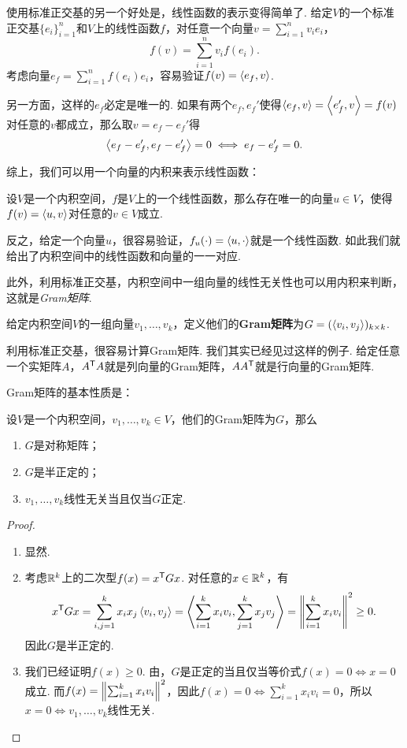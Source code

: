 使用标准正交基的另一个好处是，线性函数的表示变得简单了. 给定$V$的一个标准正交基$\{e_i\}_{i=1}^n$和$V$上的线性函数$f$，对任意一个向量$v=\sum_{i=1}^nv_ie_i$，
\[f(v)=\sum_{i=1}^nv_if(e_i).\]
考虑向量$e_f=\sum_{i=1}^nf(e_i)e_i$，容易验证$f(v)=\left\langle{e_f},{v}\right\rangle$. 

另一方面，这样的$e_f$必定是唯一的. 如果有两个$e_f,e_f'$使得$\left\langle{e_f},{v}\right\rangle=\left\langle{e_f'},{v}\right\rangle=f(v)$对任意的$v$都成立，那么取$v=e_f-e_f'$得
\[\left\langle{e_f-e_f'},{e_f-e_f'}\right\rangle=0\iff e_f-e_f'=0.\]

综上，我们可以用一个向量的内积来表示线性函数：

\begin{theorem}[Riesz表示定理]\label{thm:riesz}
设$V$是一个内积空间，$f$是$V$上的一个线性函数，那么存在唯一的向量$u\in V$，使得$f(v)=\left\langle{u},{v}\right\rangle$对任意的$v\in V$成立.
\end{theorem}

反之，给定一个向量$u$，很容易验证，$f_u(\cdot)=\left\langle{u},{\cdot}\right\rangle$就是一个线性函数. 如此我们就给出了内积空间中的线性函数和向量的一一对应. 

此外，利用标准正交基，内积空间中一组向量的线性无关性也可以用内积来判断，这就是\emph{Gram矩阵}. 

\begin{definition}[Gram矩阵]\label{def:gram-matrix}
给定内积空间$V$的一组向量$v_1,\dots,v_k$，定义他们的\textbf{Gram矩阵}为$G=(\left\langle{v_i},{v_j}\right\rangle)_{k\times k}$. 
\end{definition}

利用标准正交基，很容易计算Gram矩阵. 我们其实已经见过这样的例子. 给定任意一个实矩阵$A$，$A^{\mathsf{T}} A$就是列向量的Gram矩阵，$AA^{\mathsf{T}}$就是行向量的Gram矩阵.

Gram矩阵的基本性质是：

\begin{proposition}\label{prop:gram}
设$V$是一个内积空间，$v_1,\dots,v_k\in V$，他们的Gram矩阵为$G$，那么
\begin{enumerate}
    \item $G$是对称矩阵；
    \item $G$是半正定的；
    \item $v_1,\dots,v_k$线性无关当且仅当$G$正定.
\end{enumerate}
\end{proposition}
\begin{proof}
\begin{enumerate}
    \item 显然.
    \item 考虑$\mathbb{R}^k$上的二次型$f(x)=x^{\mathsf{T}} Gx$. 对任意的$x\in\mathbb{R}^k$，有
    \[
        x^{\mathsf{T}} G x=\sum_{i,j=1}^kx_ix_j\left\langle{v_i},{v_j}\right\rangle
        =\left\langle{\sum_{i=1}^kx_iv_i},{\sum_{j=1}^kx_jv_j}\right\rangle
        =\left\|\sum_{i=1}^kx_iv_i\right\|^2\geq 0.
    \]
    因此$G$是半正定的.
    \item 我们已经证明$f(x)\geq 0$. 由，$G$是正定的当且仅当等价式$f(x)=0\iff x=0$成立. 而$f(x)=\left\|\sum_{i=1}^kx_iv_i\right\|^2$，因此$f(x)=0\iff \sum_{i=1}^kx_iv_i=0$，所以$x=0\iff v_1,\dots,v_k$线性无关.
\end{enumerate}
\end{proof}

